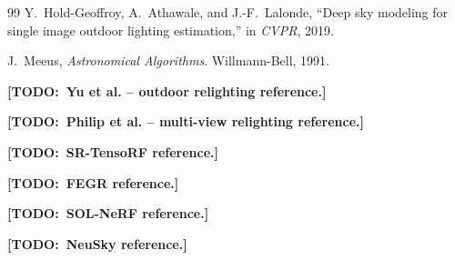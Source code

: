\documentclass[conference]{IEEEtran}
\newcommand{\todo}[1]{{\color{red}\textbf{[TODO:~#1]}}}
\begin{document}
{\begin{thebibliography}{99}
        Y.~Hold-Geoffroy, A.~Athawale, and J.-F.~Lalonde,
        ``Deep sky modeling for single image outdoor lighting estimation,''
        in \emph{CVPR}, 2019.

        J.~Meeus,
        \emph{Astronomical Algorithms}.
        Willmann-Bell, 1991.

        \todo{Yu et al. -- outdoor relighting reference.}

        \todo{Philip et al. -- multi-view relighting reference.}

        \todo{SR-TensoRF reference.}

        \todo{FEGR reference.}

        \todo{SOL-NeRF reference.}

        \todo{NeuSky reference.}

    \end{thebibliography}
}
\end{document}
